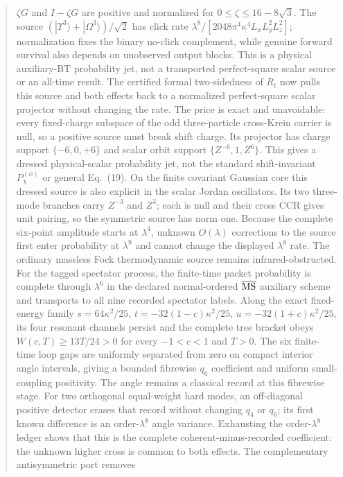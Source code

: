 \documentclass[11pt]{article}
\theoremstyle{definition}
\theoremstyle{remark}
\begin{document}
\begin{abstract}
$\zeta G$ and $I-\zeta G$ are positive and normalized for
$0\leq\zeta\leq16-8\sqrt3$.  The source
$(|\Upsilon^3\rangle+|\Omega^3\rangle)/\sqrt2$ has click rate
$\lambda^8/[2048\pi^4\kappa^4L_xL_y^2L_z^2]$; normalization fixes the binary
no-click complement, while genuine forward survival also depends on
unobserved output blocks.  This is a physical auxiliary-BT probability jet,
not a transported perfect-square scalar source or an all-time result.
The certified formal two-sidedness of $R_t$ now pulls this source and both
effects back to a normalized perfect-square scalar projector without changing
the rate.  The price is exact and unavoidable: every fixed-charge subspace of
the odd three-particle cross-Krein carrier is null, so a positive source must
break shift charge.  Its projector has charge support $\{-6,0,+6\}$ and scalar
orbit support $\{Z^{-6},1,Z^6\}$.  This gives a dressed physical-scalar
probability jet, not the standard shift-invariant $P_\chi^{(\phi)}$ or general
Eq.~(19).
On the finite covariant Gaussian core this dressed source is also explicit in
the scalar Jordan oscillators.  Its two three-mode branches carry $Z^{-3}$
and $Z^3$; each is null and their cross CCR gives unit pairing, so the
symmetric source has norm one.  Because the complete six-point amplitude
starts at $\lambda^4$, unknown $O(\lambda)$ corrections to the source first
enter probability at $\lambda^9$ and cannot change the displayed
$\lambda^8$ rate.  The ordinary massless Fock thermodynamic source remains
infrared-obstructed.
For the tagged spectator process, the finite-time packet probability is
complete through $\lambda^6$ in the declared normal-ordered
$\overline{\rm MS}$ auxiliary scheme and transports to all nine recorded
spectator labels.  Along the exact fixed-energy family
$s=64\kappa^2/25$, $t=-32(1-c)\kappa^2/25$,
$u=-32(1+c)\kappa^2/25$, its four resonant channels persist and the complete
tree bracket obeys $W(c,T)\geq13T/24>0$ for every
$-1<c<1$ and $T>0$.  The six finite-time loop gaps are uniformly separated
from zero on compact interior angle intervals, giving a bounded fibrewise
$q_6$ coefficient and uniform small-coupling positivity.  The angle remains
a classical record at this fibrewise stage.  For two orthogonal equal-weight
hard modes, an off-diagonal positive detector erases that record without
changing $q_4$ or $q_6$; its first known difference is an order-$\lambda^8$
angle variance.  Exhausting the order-$\lambda^8$ ledger shows that this is
the complete coherent-minus-recorded coefficient: the unknown higher cross
is common to both effects.  The complementary antisymmetric port removes

\end{abstract}
\end{document}
